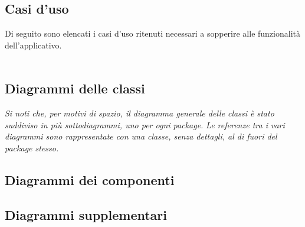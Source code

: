 \subsection{Casi d'uso}
Di seguito sono elencati i casi d'uso ritenuti necessari a sopperire alle funzionalità
dell'applicativo.
\\\\





\pagebreak


\pagebreak
\subsection{Diagrammi delle classi}

\textit{Si noti che, per motivi di spazio, il diagramma generale delle classi è stato suddiviso in più sottodiagrammi, uno per ogni package.}
\textit{Le referenze tra i vari diagrammi sono rappresentate con una classe, senza dettagli, al di fuori del package stesso.}






\pagebreak
\subsection{Diagrammi dei componenti}


\pagebreak
\subsection{Diagrammi supplementari}

\pagebreak

\pagebreak

